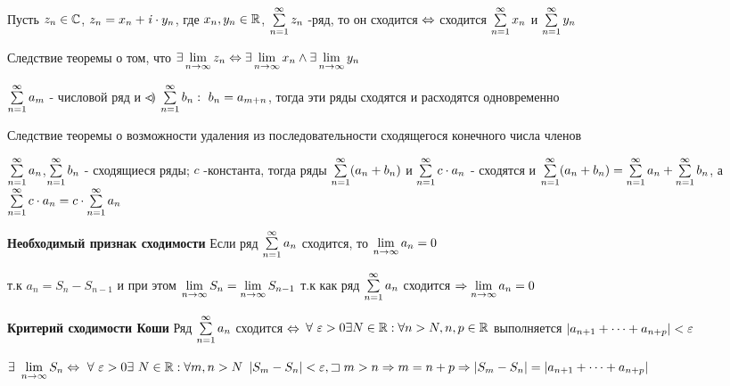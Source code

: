 \begin{proofs}
\begin{enumerate*}
	\item Пусть $z_n \in \mathbb{C}$, $z_n = x_n + \mathit{i}\cdot y_n$, где $x_n, y_n \in \mathbb{R}$, $\sum\limits_{n=1}^{\infty}z_n$ -ряд, то он сходится $\Leftrightarrow$ сходится $\sum\limits_{n=1}^{\infty}x_n$ и $\sum\limits_{n=1}^{\infty}y_n$
	\begin{dokvo}
		Следствие теоремы о том, что $\exists \lim\limits_{n \to \infty}z_n \Leftrightarrow \exists \lim\limits_{n \to \infty}x_n \wedge \exists \lim\limits_{n \to \infty}y_n$
	\end{dokvo}

	\item $\sum\limits_{n=1}^{\infty}a_m$ - числовой ряд и $\mkern3mu\circ\mkern-19mu<\mkern-4mu)$ $\sum\limits_{n=1}^{\infty}b_n: \ b_n = a_{m+n}$, тогда эти ряды сходятся и расходятся одновременно
	\begin{dokvo}
	Следствие теоремы о возможности удаления из последовательности сходящегося конечного числа членов
	\end{dokvo}

	\item $\sum\limits_{n=1}^{\infty}a_n$,$\sum\limits_{n=1}^{\infty}b_n$ - сходящиеся ряды; $c$ -константа, тогда ряды $\sum\limits_{n=1}^{\infty}(a_n+b_n)$ и $\sum\limits_{n=1}^{\infty}c \cdot a_n$ - сходятся и $\sum\limits_{n=1}^{\infty}(a_n+b_n) = \sum\limits_{n=1}^{\infty}a_n + \sum\limits_{n=1}^{\infty}b_n$, а $\sum\limits_{n=1}^{\infty}c\cdot a_n = c \cdot \sum\limits_{n=1}^{\infty}a_n$

	\item \textbf{Необходимый признак сходимости} Если ряд $\sum\limits_{n=1}^{\infty}a_n$ сходится, то $\lim\limits_{n \to \infty}a_n = 0$
	\begin{dokvo}
		т.к $a_n = S_n - S_{n-1}$ и при этом $\lim\limits_{n\to \infty}S_n = \lim\limits_{n\to \infty}S_{n-1}$ т.к как ряд $\sum\limits_{n=1}^{\infty}a_n$ сходится $\Rightarrow \lim\limits_{n \to \infty}a_n=0$
	\end{dokvo}

	\item \textbf{Критерий сходимости Коши} Ряд $\sum\limits_{n=1}^{\infty}a_n$ сходится $\Leftrightarrow$ $\forall \ \epsilon > 0 \exists N \in \Natural: \forall n > N, n,p\in \Natural$ выполняется $\left| a_{n+1}+ \cdots + a_{n+p}\right| < \varepsilon$
	\begin{dokvo}
		$\exists \ \predel{n\to \infty}S_n \tittg \ \forall \ \epsilon > 0 \exists \ N\in \Natural: \forall m,n > N \ \Modul{S_m - S_n} < \epsilon, \pust m > n \sledue m = n + p \sledue \Modul{S_m - S_n} = \Modul{a_{n+1}+ \cdots + a_{n+p}}$
	\end{dokvo}
\end{enumerate*}
\end{proofs}

